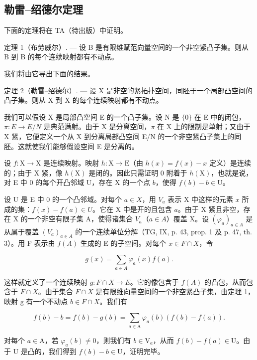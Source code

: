 \subsection{勒雷--绍德尔定理}

下面的定理将在 TA（待出版）中证明。

定理 1（布劳威尔）. --- 设 B 是有限维赋范向量空间的一个非空紧凸子集。则从 B 到 B 的每个连续映射都有不动点。

我们将由它导出下面的结果。

定理 2（勒雷--绍德尔）. --- 设 X 是非空的紧拓扑空间，同胚于一个局部凸空间的凸子集。则从 X 到 X 的每个连续映射都有不动点。

我们可以假设 X 是局部凸空间 E 的一个凸子集。设 N 是 \(\{0\}\) 在 E 中的闭包，\(\pi: E \rightarrow E/N\) 是典范满射。由于 X 是分离空间，\(\pi\) 在 X 上的限制是单射；又由于 X 紧，它便定义一个从 X 到分离局部凸空间 E/N 的一个非空紧凸子集上的同胚。这就使我们能够假设空间 E 是分离的。

设 \(f: \mathrm{X} \to \mathrm{X}\) 是连续映射。映射 \(h: \mathrm{X} \to \mathrm{E}\)（由 \(h(x) = f(x) - x\) 定义）是连续的；由于 X 紧，像 \(h(\mathrm{X})\) 是闭的。因此只需证明 0 附着于 \(h(\mathrm{X})\)，也就是说，对 E 中 0 的每个开凸邻域 U，存在 X 的一个点 \(b\)，使得 \(f(b) - b \in \mathrm{U}\)。

设 U 是 E 中 0 的一个凸邻域。对每个 \(a \in X\)，用 \(V_a\) 表示 X 中这样的元素 \(x\) 所成的集：\(f(x) - f(a) \in U\)。它在 X 中是开的且包含 \(a\)。由于 X 紧且非空，存在 X 的一个非空有限子集 A，使得诸集合 \(V_a\)（\(a \in A\)）覆盖 X。设 \((\varphi_a)_{a \in A}\) 是从属于覆盖 \((V_a)_{a \in A}\) 的一个连续单位分解（TG, IX, p. 43, prop. 1 及 p. 47, th. 3）。用 F 表示由 \(f(A)\) 生成的 E 的子空间。对每个 \(x \in F \cap X\)，令

\[
g (x) = \sum_ {a \in A} \varphi_ {a} (x) f (a).
\]

这样就定义了一个连续映射 \(g: F \cap X \to E\)。它的像包含于 \(f(A)\) 的凸包，从而包含于 \(F \cap X\)。由于集合 \(F \cap X\) 是有限维向量空间的一个非空紧凸子集，由定理 1，映射 g 有一个不动点 \(b \in F \cap X\)。我们有

\[
f (b) - b = f (b) - g (b) = \sum_ {a \in \mathrm{A}} \varphi_ {a} (b) (f (b) - f (a)).
\]

对每个 \(a \in \mathrm{A}\)，若 \(\varphi_{a}(b) \neq 0\)，则我们有 \(b \in \mathrm{V}_{a}\)，从而 \(f(b) - f(a) \in \mathrm{U}\)。由于 U 是凸的，我们得到 \(f(b) - b \in \mathrm{U}\)，证明完毕。

